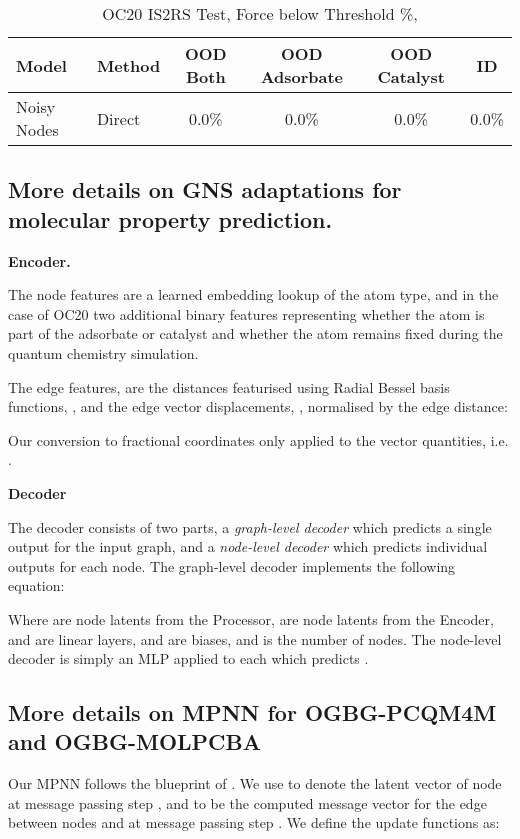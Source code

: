 \documentclass{article} \usepackage{iclr2022_conference,times}
\begin{document}
\begin{table}
\caption{OC20 IS2RS Test, Force below Threshold \%, }
\label{tab:IS2RS_force_2}
\centering
\begin{tabular}{llcccc}
  \toprule
  Model & Method & OOD Both & OOD Adsorbate & OOD Catalyst & ID \\
  \midrule
  Noisy Nodes & Direct & 0.0\% & 0.0\% & 0.0\% & 0.0\% \\
  \bottomrule
\end{tabular}
\end{table}

\subsection{More details on GNS adaptations for molecular property prediction.}

\textbf{Encoder.}

The node features are a learned embedding lookup of the atom type, and in the case of OC20 two additional binary features representing whether the atom is part of the adsorbate or catalyst and whether the atom remains fixed during the quantum chemistry simulation.

The edge features,  are the distances  featurised using  Radial Bessel basis functions, , and the edge vector displacements, , normalised by the edge distance:



Our conversion to fractional coordinates only applied to the vector quantities, i.e. .

\textbf{Decoder}

The decoder consists of two parts, a \textit{graph-level decoder} which predicts a single output for the input graph, and a \textit{node-level decoder} which predicts individual outputs for each node. The graph-level decoder implements the following equation:



Where  are node latents from the Processor,  are node latents from the Encoder,  and  are linear layers,  and  are biases, and  is the number of nodes. The node-level decoder is simply an MLP applied to each  which predicts .


\subsection{More details on MPNN for OGBG-PCQM4M and OGBG-MOLPCBA}

Our MPNN follows the blueprint of \cite{Gilmer2017NeuralMP}.  We use  to denote the latent vector of node  at message passing step , and  to be the computed message vector for the edge between nodes  and  at message passing step .  We define the update functions as:
\end{document}
